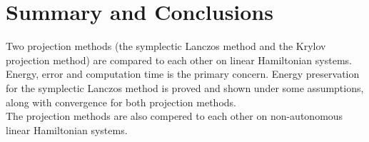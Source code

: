 \section*{Summary and Conclusions}
Two projection methods (the symplectic Lanczos method and the Krylov projection method) are compared to each other on linear Hamiltonian systems. Energy, error and computation time is the primary concern. Energy preservation for the symplectic Lanczos method is proved and shown under some assumptions, along with convergence for both projection methods. \\
The projection methods are also compered to each other on non-autonomous linear Hamiltonian systems.



